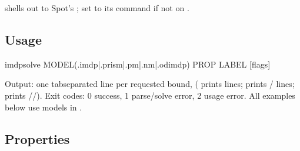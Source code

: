 \documentclass[a4paper,10pt,english]{sphinxmanual}
\begin{document}
\sphinxAtStartPar
{} shells out to Spot’s ; set  to its command if not on
.


\subsection{Usage}
\label{\detokenize{manual/cli:usage}}
\begin{sphinxVerbatim}[commandchars=\\\{\}]
imdp\PYGZus{}solve MODEL(.imdp|.prism|.pm|.nm|.odimdp) PROP LABEL [flags]
\end{sphinxVerbatim}

\sphinxAtStartPar
Output: one tab\sphinxhyphen{}separated  line per requested bound,
( prints  lines;  prints / lines;  prints
//). Exit codes: 0 success, 1 parse/solve error, 2 usage
error. All examples below use models in .


\subsection{Properties}
\label{\detokenize{manual/cli:properties}}
\end{document}
